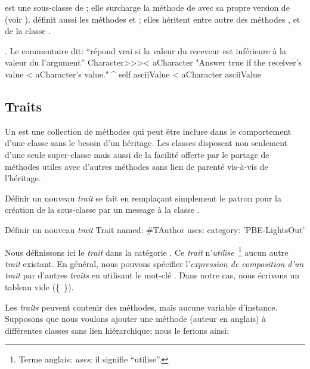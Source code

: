 \documentclass[a4paper,10pt,twoside]{book}
\begin{document}
 est une sous-classe de ; elle surcharge la méthode  de \ct{<} avec sa propre version de \ct{<} (voir ).   définit aussi les méthodes \ct{=} et ; elles héritent entre autre des méthodes \mbox{\ct{>=},} \ct{<=} et \ct{~=} de la classe .

\begin{method}[CharacterLessThan]{. Le commentaire dit: ``répond vrai si la valeur du receveur est inférieure à la valeur du l'argument''}
Character>>>< aCharacter 
	"Answer true if the receiver's value < aCharacter's value."
	^ self asciiValue < aCharacter asciiValue
\end{method}

\subsection{Traits}
Un  est une collection de méthodes qui peut être incluse dans le comportement d'une classe sans le besoin d'un héritage.
Les classes disposent non seulement d'une seule super-classe mais aussi de la facilité offerte par le partage de méthodes utiles avec d'autres méthodes sans lien de parenté vis-à-vis de l'héritage.

Définir un nouveau \emph{trait} se fait en remplaçant simplement le patron
pour la création de la sous-classe par un message à la classe .

\begin{classdef}[tauthor]{Définir un nouveau \emph{trait}}
Trait named: #TAuthor
	uses: { }
	category: 'PBE-LightsOut'
\end{classdef}

\noindent
Nous définissons ici le \emph{trait}  dans la catégorie .
Ce \emph{trait} n'\emph{utilise}~\footnote{Terme anglais: \emph{uses}: il signifie ``utilise''.} aucun autre \emph{trait} existant.
En général, nous pouvons spécifier l'\emph{expression de composition d'un trait} par d'autres \emph{traits} en u\-ti\-li\-sant le mot-clé .
Dans notre cas, nous écrivons un tableau vide \mbox{(\{ \}).}

Les \emph{traits} peuvent contenir des méthodes, mais aucune variable d'instance.
Supposons que nous voulons ajouter une méthode  (auteur en anglais) à différentes classes sans lien hiérarchique;
nous le ferions ainsi:
\end{document}
